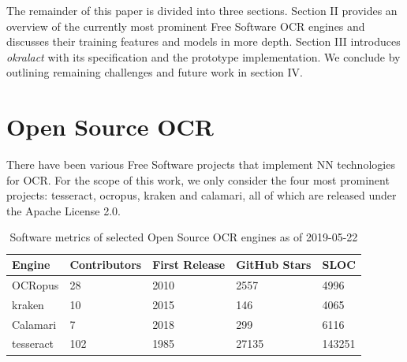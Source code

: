 \documentclass[conference]{IEEEtran}
\begin{document}

The remainder of this paper is divided into three sections. Section
II provides an overview of the currently most prominent Free
Software OCR engines and discusses their training features and models 
in more depth. Section III introduces \textit{okralact} with its
specification and the prototype implementation. We conclude by 
outlining remaining challenges and future work in section IV. 

\section{Open Source OCR}

There have been various Free Software projects that implement NN technologies
for OCR. For the scope of this work, we only consider the four most prominent projects: tesseract, ocropus, kraken and calamari, all of which are released under the Apache License 2.0.


\begin{table}[b]
\begin{tabular}{lllll}
\hline
Engine    & Contributors & First Release & GitHub Stars & SLOC \\ \hline
OCRopus   & 28           & 2010          & 2557         & 4996 \\
kraken    & 10           & 2015          & 146          & 4065 \\
Calamari  & 7            & 2018          & 299          & 6116 \\
tesseract & 102          & 1985          & 27135        & 143251 \\

\end{tabular}
\caption{Software metrics of selected Open Source OCR engines as of 2019-05-22}
\label{tab:stats}
\end{table}
\end{document}
